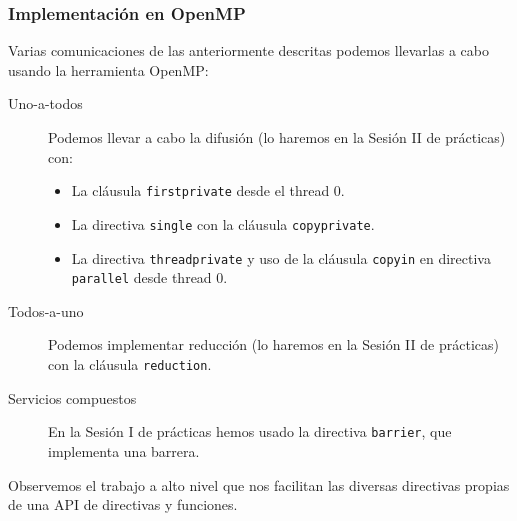 
\subsubsection{Implementación en OpenMP} 
Varias comunicaciones de las anteriormente descritas podemos llevarlas a cabo usando la herramienta OpenMP:
\begin{description}
    \item [Uno-a-todos] Podemos llevar a cabo la difusión (lo haremos en la Sesión II de prácticas) con:
        \begin{itemize}
            \item La cláusula \verb|firstprivate| desde el thread 0.
            \item La directiva \verb|single| con la cláusula \verb|copyprivate|. 
            \item La directiva \verb|threadprivate| y uso de la cláusula \verb|copyin| en directiva \verb|parallel| desde thread 0.
        \end{itemize}
    \item [Todos-a-uno] Podemos implementar reducción (lo haremos en la Sesión II de prácticas) con la cláusula \verb|reduction|. 
    \item [Servicios compuestos] En la Sesión I de prácticas hemos usado la directiva \verb|barrier|, que implementa una barrera.
\end{description}
Observemos el trabajo a alto nivel que nos facilitan las diversas directivas propias de una API de directivas y funciones.

